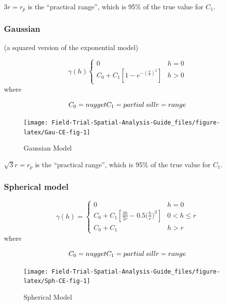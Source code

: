 \documentclass[]{book}
\begin{document}
\(3r = r_p\) is the ``practical range'', which is 95\% of the true value for \(C_1\).

\hypertarget{gaussian}{%
\subsubsection{Gaussian}\label{gaussian}}

(a squared version of the exponential model)

\[ \gamma (h)\left\{ {\begin{array}{cc} 0 & h = 0\\ C_0+C_1 \left [ 1-e^{-(\frac{h}{r})^2} \right] & h > 0 \end{array} } \right. \]
where

\[ C_0 = nugget \\ C_1 = partial \: sill \\ r = range\]

\begin{figure}

{\centering \texttt{[image: Field-Trial-Spatial-Analysis-Guide\_files/figure-latex/Gau-CE-fig-1]} 

}

\caption{Gaussian Model}\label{fig:Gau-CE-fig}
\end{figure}

\(\sqrt 3r = r_p\) is the ``practical range'', which is 95\% of the true value for \(C_1\).

\hypertarget{spherical-model}{%
\subsubsection{Spherical model}\label{spherical-model}}

\[ \gamma (h) = \left\{ {\begin{array}{cc} 0 & h = 0\\ C_0+C_1 \left[ \frac{3h}{2r}-0.5\bigg( \frac{h}{r}\bigg)^3 \right] & 0 <h \leq r \\ 
C_0 + C_1 & h > r \end{array} } \right. \]
where

\[ C_0 = nugget \\ C_1 = partial \: sill \\ r = range\]

\begin{figure}

{\centering \texttt{[image: Field-Trial-Spatial-Analysis-Guide\_files/figure-latex/Sph-CE-fig-1]} 

}

\caption{Spherical Model}\label{fig:Sph-CE-fig}
\end{figure}
\end{document}
